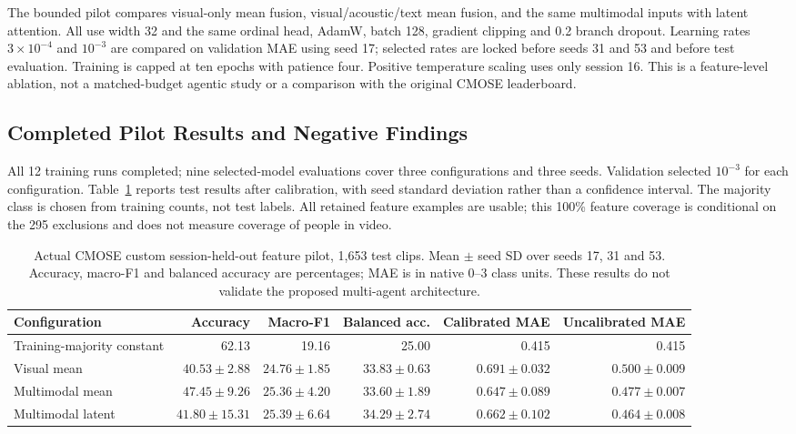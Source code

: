 \documentclass[a4paper,conference]{IEEEtran}
\begin{document}
The bounded pilot compares visual-only mean fusion, visual/acoustic/text mean fusion, and the same multimodal inputs with latent attention. All use width 32 and the same ordinal head, AdamW, batch 128, gradient clipping and 0.2 branch dropout. Learning rates $3\times10^{-4}$ and $10^{-3}$ are compared on validation MAE using seed 17; selected rates are locked before seeds 31 and 53 and before test evaluation. Training is capped at ten epochs with patience four. Positive temperature scaling uses only session 16. This is a feature-level ablation, not a matched-budget agentic study or a comparison with the original CMOSE leaderboard.

\subsection{Completed Pilot Results and Negative Findings}
All 12 training runs completed; nine selected-model evaluations cover three configurations and three seeds. Validation selected $10^{-3}$ for each configuration. Table~\ref{tab:pilot} reports test results after calibration, with seed standard deviation rather than a confidence interval. The majority class is chosen from training counts, not test labels. All retained feature examples are usable; this 100\% feature coverage is conditional on the 295 exclusions and does not measure coverage of people in video.

\begin{table}[t]
\centering\small
\caption{Actual CMOSE custom session-held-out feature pilot, 1,653 test clips. Mean $\pm$ seed SD over seeds 17, 31 and 53. Accuracy, macro-F1 and balanced accuracy are percentages; MAE is in native 0--3 class units. These results do not validate the proposed multi-agent architecture.}
\label{tab:pilot}
\begin{tabular}{lrrrrr}
\toprule
Configuration & Accuracy & Macro-F1 & Balanced acc. & Calibrated MAE & Uncalibrated MAE\\
\midrule
Training-majority constant & 62.13 & 19.16 & 25.00 & 0.415 & 0.415\\
Visual mean & $40.53\pm2.88$ & $24.76\pm1.85$ & $33.83\pm0.63$ & $0.691\pm0.032$ & $0.500\pm0.009$\\
Multimodal mean & $47.45\pm9.26$ & $25.36\pm4.20$ & $33.60\pm1.89$ & $0.647\pm0.089$ & $0.477\pm0.007$\\
Multimodal latent & $41.80\pm15.31$ & $25.39\pm6.64$ & $34.29\pm2.74$ & $0.662\pm0.102$ & $0.464\pm0.008$\\
\bottomrule
\end{tabular}
\end{table}
\end{document}
